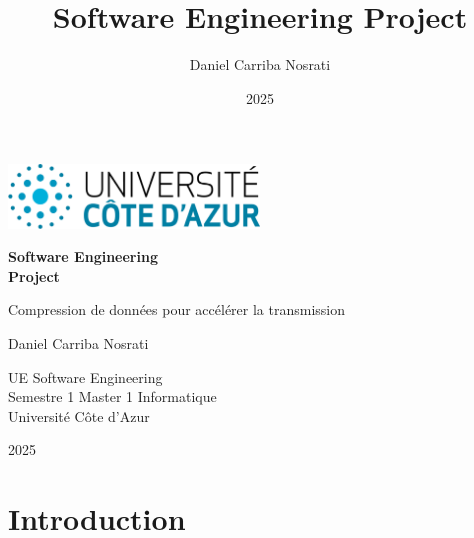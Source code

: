 \documentclass[titlepage]{article}
\title{Software Engineering Project}
\author{Daniel \sc Carriba Nosrati}
\date{2025}
\begin{document}
\begin{titlepage}
    \centering
    \vspace*{\fill}
    {\includegraphics[width=0.5\textwidth]{img/unice-logo.png} \par}
    \vfill
    {\Huge \bfseries Software Engineering\\Project \par}
    \vspace{1cm}
    {\Large Compression de données pour accélérer la transmission \par}
    \vfill
    {\Large Daniel \sc Carriba Nosrati \par}
    \vspace{0.5cm}
    {\large UE Software Engineering\\Semestre 1 Master 1 Informatique\\Université Côte d'Azur \par}
    \vspace{0.5cm}
    {\large 2025 \par}
    \vspace*{\fill} 
\end{titlepage}


\tableofcontents

\clearpage




\section{Introduction}
\end{document}
